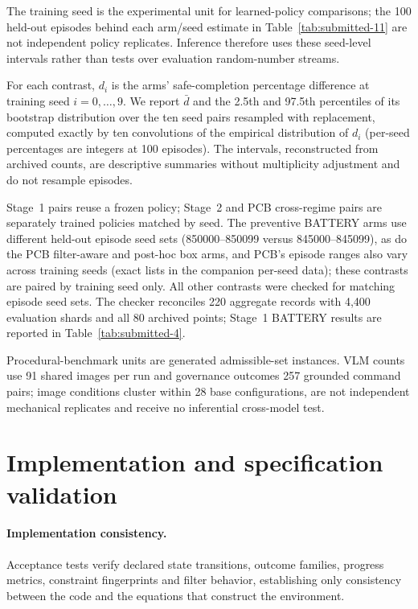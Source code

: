 \documentclass[10pt]{article}
\begin{document}
The training seed is the experimental unit for learned-policy comparisons;
the 100 held-out episodes behind each arm/seed estimate in
Table~\ref{tab:submitted-11} are not independent policy replicates. Inference therefore uses these seed-level intervals rather than tests over evaluation random-number streams.

For each contrast, $d_i$ is the arms' safe-completion percentage difference
at training seed $i=0,\ldots,9$. We report $\bar d$ and the 2.5th and 97.5th
percentiles of its bootstrap distribution over the ten seed pairs resampled
with replacement, computed exactly by ten convolutions of the empirical
distribution of $d_i$ (per-seed percentages are integers at 100 episodes). The intervals, reconstructed from archived counts,
are descriptive summaries without multiplicity adjustment and do not resample episodes.

Stage~1 pairs reuse a frozen policy; Stage~2 and PCB cross-regime pairs are
separately trained policies matched by seed. The preventive BATTERY arms use
different held-out episode seed sets (850000--850099 versus 845000--845099),
as do the PCB filter-aware and post-hoc box arms, and PCB's episode ranges
also vary across training seeds (exact lists in the companion per-seed data);
these contrasts are paired by training seed only. All other contrasts were
checked for matching episode seed sets. The checker reconciles
220 aggregate records with 4,400 evaluation shards and all 80 archived
 points; Stage~1 BATTERY results
are reported in Table~\ref{tab:submitted-4}.



Procedural-benchmark units are generated admissible-set instances. VLM counts
use 91 shared images per run and governance outcomes 257 grounded command
pairs; image conditions cluster within 28 base configurations, are not
independent mechanical replicates and receive no inferential cross-model test.



\let\SIsavedFB\FloatBarrier\let\FloatBarrier\relax
\section{Implementation and specification validation}
\let\FloatBarrier\SIsavedFB

\paragraph{Implementation consistency.}
Acceptance tests verify declared state transitions, outcome families,
progress metrics, constraint fingerprints and filter behavior, establishing
only consistency between the code and the equations that construct the
environment.
\end{document}
